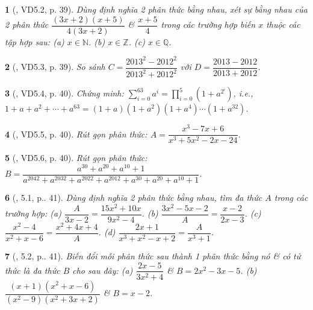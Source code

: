 \documentclass{article}
\newtheorem{baitoan}{}
\begin{document}
\begin{baitoan}[\cite{TLCT_THCS_Toan_8_dai_so}, VD5.2, p. 39]
	Dùng định nghĩa 2 phân thức bằng nhau, xét sự bằng nhau của 2 phân thức $\dfrac{(3x + 2)(x + 5)}{4(3x + 2)}$ \& $\dfrac{x + 5}{4}$ trong các trường hợp biến $x$ thuộc các tập hợp sau: (a) $x\in\mathbb{N}$. (b) $x\in\mathbb{Z}$. (c) $x\in\mathbb{Q}$.
\end{baitoan}

\begin{baitoan}[\cite{TLCT_THCS_Toan_8_dai_so}, VD5.3, p. 39]
	So sánh $C = \dfrac{2013^2 - 2012^2}{2013^2 + 2012^2}$ với $D = \dfrac{2013 - 2012}{2013 + 2012}$.
\end{baitoan}

\begin{baitoan}[\cite{TLCT_THCS_Toan_8_dai_so}, VD5.4, p. 40]
	Chứng minh: $\sum_{i=0}^{63} a^i = \prod_{i=0}^{5} (1 + a^{2^i})$, i.e., $1 + a + a^2 + \cdots + a^{63} = (1 + a)(1 + a^2)(1 + a^4)\cdots(1 + a^{32})$.
\end{baitoan}

\begin{baitoan}[\cite{TLCT_THCS_Toan_8_dai_so}, VD5.5, p. 40]
	Rút gọn phân thức: $A = \dfrac{x^3 - 7x + 6}{x^3 + 5x^2 - 2x - 24}$.
\end{baitoan}

\begin{baitoan}[\cite{TLCT_THCS_Toan_8_dai_so}, VD5.6, p. 40]
	Rút gọn phân thức: $B = \dfrac{a^{30} + a^{20} + a^{10} + 1}{a^{2042} + a^{2032} + a^{2022} + a^{2012} + a^{30} + a^{20} + a^{10} + 1}$.
\end{baitoan}

\begin{baitoan}[\cite{TLCT_THCS_Toan_8_dai_so}, 5.1, p.. 41]
	Dùng định nghĩa 2 phân thức bằng nhau, tìm đa thức $A$ trong các trường hợp: (a) $\dfrac{A}{3x - 2} = \dfrac{15x^2 + 10x}{9x^2 - 4}$. (b) $\dfrac{3x^2 - 5x - 2}{A} = \dfrac{x - 2}{2x - 3}$. (c) $\dfrac{x^2 - 4}{x^2 + x - 6} = \dfrac{x^2 + 4x + 4}{A}$. (d) $\dfrac{2x + 1}{x^3 + x^2 - x + 2} = \dfrac{A}{x^3 + 1}$.
\end{baitoan}

\begin{baitoan}[\cite{TLCT_THCS_Toan_8_dai_so}, 5.2, p.. 41]
	Biến đổi mỗi phân thức sau thành 1 phân thức bằng nó \& có tử thức là đa thức $B$ cho sau đây: (a) $\dfrac{2x - 5}{3x^2 + 4}$ \& $B = 2x^2 - 3x - 5$. (b) $\dfrac{(x + 1)(x^2 + x - 6)}{(x^2 - 9)(x^2 + 3x + 2)}$ \& $B = x - 2$.
\end{baitoan}
\end{document}
